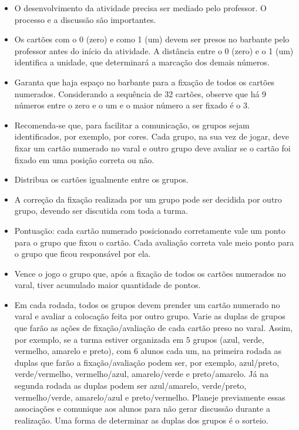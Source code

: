 \begin{orientacoes}{}{}
\begin{itemize}
  \item O desenvolvimento da atividade precisa ser mediado pelo professor. O processo e a discussão são importantes.
  \item Os cartões com o 0 (zero) e como 1 (um) devem ser presos no barbante pelo professor antes do início da atividade. A distância entre o 0 (zero) e o 1 (um) identifica a unidade, que determinará a marcação dos demais números.
  \item Garanta que haja espaço no barbante  para a fixação de todos os cartões numerados. Considerando a sequência de 32 cartões, observe que há 9 números entre o zero e o um e o maior número a ser fixado é o 3.
  \item Recomenda-se que, para facilitar a comunicação, os grupos sejam identificados, por exemplo, por cores. Cada grupo, na sua vez de jogar, deve fixar um cartão numerado no varal e outro grupo deve avaliar se o cartão foi fixado em uma posição correta ou não.
  \item Distribua os cartões igualmente entre os grupos.
  \item A correção da fixação realizada por um grupo pode ser decidida por outro grupo, devendo ser discutida com toda a turma.
  \item Pontuação: cada cartão numerado posicionado corretamente vale um ponto para o grupo que fixou o cartão. Cada avaliação correta vale meio ponto para o grupo que ficou responsável por ela.
  \item Vence o jogo o grupo que, após a fixação de todos os cartões numerados no varal, tiver acumulado maior quantidade de pontos.
  \item Em cada rodada, todos os grupos devem prender um cartão numerado no varal e avaliar a colocação feita por outro grupo. Varie as duplas de grupos que farão as ações de fixação/avaliação de cada cartão preso no varal. Assim, por exemplo, se a turma estiver organizada em $5$ grupos (azul, verde, vermelho, amarelo e preto), com 6 alunos cada um, na primeira rodada as duplas que farão a fixação/avaliação podem ser, por exemplo, azul/preto, verde/vermelho, vermelho/azul, amarelo/verde e preto/amarelo. Já na segunda rodada as duplas podem ser azul/amarelo, verde/preto, vermelho/verde, amarelo/azul e preto/vermelho. Planeje previamente essas associações e comunique aos alunos para não gerar discussão durante a realização. Uma forma de determinar as duplas dos grupos é o sorteio. 

\end{itemize}
\end{orientacoes}
